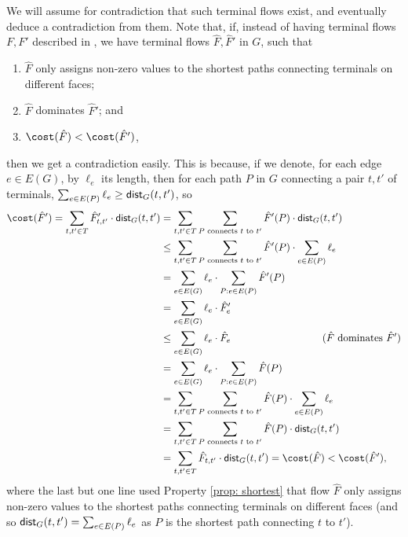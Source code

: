 \documentclass[11pt]{article}
\newcommand{\dist}{\textnormal{\textsf{dist}}}
\newenvironment{properties}[2][0]
{\renewcommand{\theenumi}{#2\arabic{enumi}}
	\begin{enumerate} \setcounter{enumi}{#1}}{\end{enumerate}\renewcommand{\theenumi}{\arabic{enumi}}}
\begin{document}
We will assume for contradiction that such terminal flows exist, and eventually deduce a contradiction from them.
Note that, if, instead of having terminal flows $F,F'$ described in , we have terminal flows $\hat F,\hat F'$ in $G$, such that
\begin{properties}{P}
    \item $\hat F$ only assigns non-zero values to the shortest paths connecting terminals on different faces;\label{prop: shortest}
    \item $\hat F$ dominates $\hat F'$; and \label{prop: dominates}
    \item $\cost(\hat F)<\cost(\hat F')$, \label{prop: cost}
\end{properties}
then we get a contradiction easily. This is because, if we denote, for each edge $e\in E(G)$, by $\ell_e$ its length, then for each path $P$ in $G$ connecting a pair $t,t'$ of terminals, $\sum_{e\in E(P)}\ell_e\ge \dist_G(t,t')$, so
\[
\begin{split}
\cost(\hat F') =\sum_{t,t'\in T}\hat F'_{t,t'}\cdot \dist_G(t,t') & =\sum_{t,t'\in T}  \sum_{P \text{ connects } t\text{ to }t'}\hat F'(P)\cdot\dist_G(t,t')  \\
& \le \sum_{t,t'\in T}  \sum_{P \text{ connects } t\text{ to }t'}\hat F'(P)\cdot\sum_{e\in E(P)}\ell_e  \\
& =\sum_{e\in E(G)} \ell_e \cdot \sum_{P: e\in E(P)}\hat F'(P)  \\
& =\sum_{e\in E(G)} \ell_e \cdot \hat F'_e  \\
& \le \sum_{e\in E(G)} \ell_e \cdot \hat F_e   \quad\quad\quad\quad\quad\quad\quad\quad\quad\text{($\hat F$ dominates $\hat F'$)}
\\
& =\sum_{e\in E(G)} \ell_e \cdot \sum_{P: e\in E(P)}\hat F(P)  \\ 
& = \sum_{t,t'\in T}  \sum_{P \text{ connects } t\text{ to }t'}\hat F(P)\cdot\sum_{e\in E(P)}\ell_e  \\
& =\sum_{t,t'\in T}  \sum_{P \text{ connects } t\text{ to }t'}\hat F(P)\cdot\dist_G(t,t')  \\
& =\sum_{t,t'\in T}\hat F_{t,t'}\cdot \dist_G(t,t')
= \cost(\hat F) < \cost(\hat F'),
\end{split}
\]
where the last but one line used Property \ref{prop: shortest} that flow $\hat F$ only assigns non-zero values to the shortest paths connecting terminals on different faces (and so $\dist_G(t,t')=\sum_{e\in E(P)}\ell_e$ as $P$ is the shortest path connecting $t$ to $t'$).
\end{document}
